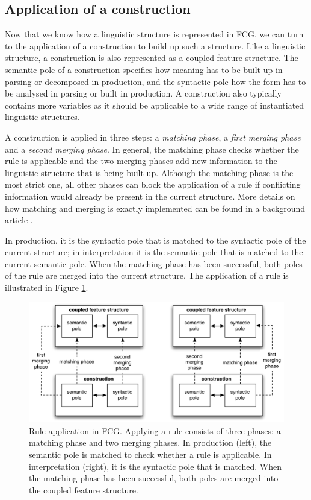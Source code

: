 \subsection{Application of a construction}

Now that we know how a linguistic structure is represented in FCG, we
can turn to the application of a construction to build up such a
structure. Like a linguistic structure, a construction is also
represented as a coupled-feature structure. The semantic pole of a
construction specifies how meaning has to be built up in parsing or
decomposed in production, and the syntactic pole how the form has to
be analysed in parsing or built in production. A construction also
typically contains more variables as it should be applicable to a wide
range of instantiated linguistic structures.

A construction is applied in three steps: a \emph{matching phase}, a
\emph{first merging phase} and a \emph{second merging phase}. In
general, the matching phase checks whether the rule is applicable and
the two merging phases add new information to the linguistic structure
that is being built up. Although the matching phase is the most strict
one, all other phases can block the application of a rule if
conflicting information would already be present in the current
structure. More details on how matching and merging is exactly
implemented can be found in a background article
\citep{steels06unify}.

In production, it is the syntactic pole that is matched to the
syntactic pole of the current structure; in interpretation it is the
semantic pole that is matched to the current semantic pole. When the
matching phase has been successful, both poles of the rule are merged
into the current structure. The application of a rule is illustrated
in Figure \ref{f:fcg-rule-application}.

\begin{figure}[htb]
  \begin{center}
    \includegraphics[width=\textwidth]{./frameworks/figures/fcg-rule-application.pdf}
    \caption[Application of a rule]{Rule application in FCG. Applying
      a rule consists of three phases: a matching phase and two
      merging phases. In production (left), the semantic pole is
      matched to check whether a rule is applicable. In interpretation
      (right), it is the syntactic pole that is matched. When the
      matching phase has been successful, both poles are merged into
      the coupled feature structure.}
    \label{f:fcg-rule-application}
  \end{center}
\end{figure}

